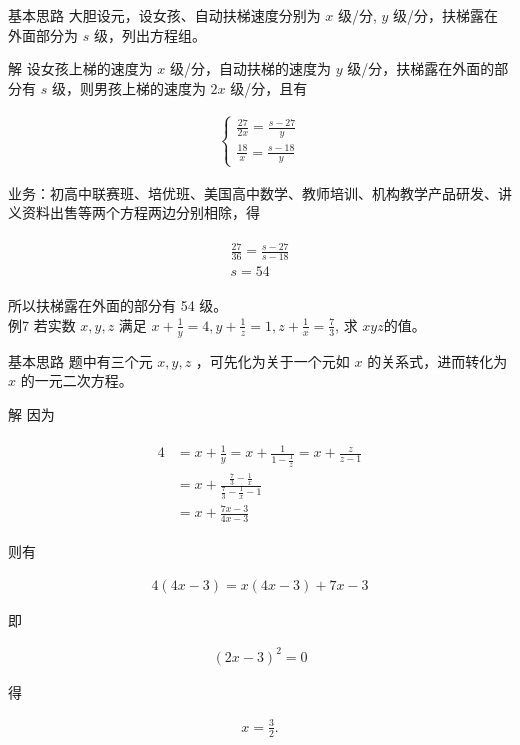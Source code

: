 \documentclass[10pt]{article}
\begin{document}
基本思路 大胆设元，设女孩、自动扶梯速度分别为 $x$ 级/分, $y$ 级/分，扶梯露在外面部分为 $s$ 级，列出方程组。

解 设女孩上梯的速度为 $x$ 级/分，自动扶梯的速度为 $y$ 级/分，扶梯露在外面的部分有 $s$ 级，则男孩上梯的速度为 $2 x$ 级/分，且有

\begin{align*}
\left\{\begin{array}{l}
\frac{27}{2 x}=\frac{s-27}{y} \\
\frac{18}{x}=\frac{s-18}{y}
\end{array}\right.
\end{align*}

业务：初高中联赛班、培优班、美国高中数学、教师培训、机构教学产品研发、讲义资料出售等两个方程两边分别相除，得

\begin{align*}
\begin{gathered}
\frac{27}{36}=\frac{s-27}{s-18} \\
s=54
\end{gathered}
\end{align*}

所以扶梯露在外面的部分有 54 级。\\
例7 若实数 $x, y, z$ 满足 $x+\frac{1}{y}=4, y+\frac{1}{z}=1, z+\frac{1}{x}=\frac{7}{3}$, 求 $x y z$的值。

基本思路 题中有三个元 $x, y, z$ ，可先化为关于一个元如 $x$ 的关系式，进而转化为 $x$ 的一元二次方程。

解 因为

\begin{align*}
\begin{aligned}
4 & =x+\frac{1}{y}=x+\frac{1}{1-\frac{1}{z}}=x+\frac{z}{z-1} \\
& =x+\frac{\frac{7}{3}-\frac{1}{x}}{\frac{7}{3}-\frac{1}{x}-1} \\
& =x+\frac{7 x-3}{4 x-3}
\end{aligned}
\end{align*}

则有

\begin{align*}
4(4 x-3)=x(4 x-3)+7 x-3
\end{align*}

即

\begin{align*}
(2 x-3)^{2}=0
\end{align*}

得

\begin{align*}
x=\frac{3}{2} .
\end{align*}
\end{document}
